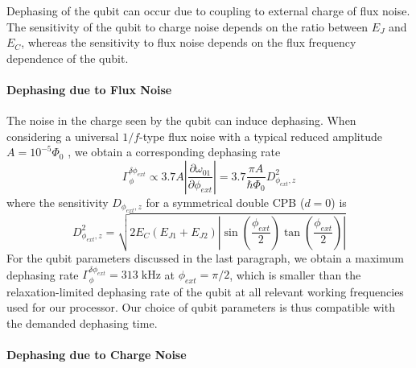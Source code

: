 Dephasing of the qubit can occur due to coupling to external charge of flux noise. The sensitivity of the qubit to charge noise depends on the ratio between $E_J$ and $E_C$, whereas the sensitivity to flux noise depends on the flux frequency dependence of the qubit.

\paragraph{Dephasing due to Flux Noise}

The noise in the charge seen by the qubit can induce dephasing. When considering a universal $1/f$-type flux noise with a typical reduced amplitude $A=10^{-5}\Phi_0$ \citep{koch_charge-insensitive_2007}, we obtain a corresponding dephasing rate
%
\begin{equation}
\Gamma_\phi^{\delta \phi_{ext}} \propto 3.7A\left|\frac{\partial \omega_{01}}{\partial \phi_{ext}}\right| = 3.7\frac{\pi A}{\hbar \Phi_0}D_{\phi_{ext},z}^2
\end{equation}
%
where the sensitivity $D_{\phi_{ext},z}$ for a symmetrical double CPB ($d=0$) is
%
\begin{equation}
D_{\phi_{ext},z}^2 = \sqrt{2E_C(E_{J1}+E_{J2})\left|\sin{\left(\frac{\phi_{ext}}{2}\right)}\tan{\left(\frac{\phi_{ext}}{2}\right)}\right|}
\end{equation}
%
For the qubit parameters discussed in the last paragraph, we obtain a maximum dephasing rate $\Gamma_\phi^{\delta \phi_{ext}}=313\;\mathrm{kHz}$ at $\phi_{ext}=\pi/2$, which is smaller than the relaxation-limited dephasing rate of the qubit at all relevant working frequencies used for our processor. Our choice of qubit parameters is thus compatible with the demanded dephasing time.

\paragraph{Dephasing due to Charge Noise}

